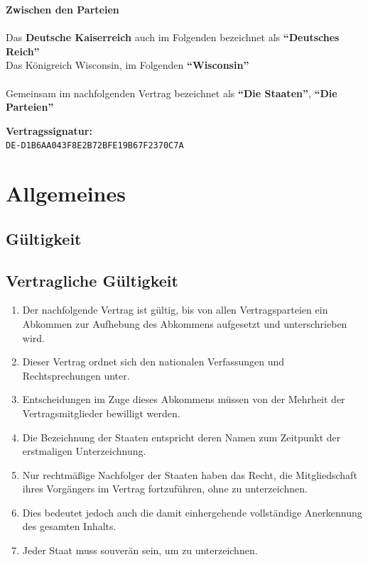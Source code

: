 \documentclass{article}
\begin{document}
\begin{center}
\begin{minipage}{0.45\textwidth}
    \end{minipage}
\end{center}


\begin{center}
    \textbf{Zwischen den Parteien\\}\textbf{\\}
    Das \textbf{Deutsche Kaiserreich} auch im Folgenden bezeichnet als \textbf{``Deutsches Reich''\\}
    Das Königreich Wisconsin, im Folgenden \textbf{``Wisconsin''\\}
    \textbf{\\}
    Gemeinsam im nachfolgenden Vertrag bezeichnet als \textbf{``Die Staaten''}, \textbf{``Die Parteien''}

\end{center}
\newpage
{}
\vspace*{\fill}
\begin{Center}
\textbf{Vertragssignatur:\\}
\texttt{DE-D1B6AA043F8E2B72BFE19B67F2370C7A}
\vspace*{\fill}
\end{Center}
\newpage
\section{Allgemeines}
\subsection{Gültigkeit}

\subsection{Vertragliche Gültigkeit}
\begin{enumerate}[(1)]
    \item Der nachfolgende Vertrag ist gültig, bis von allen Vertragsparteien ein Abkommen zur Aufhebung des Abkommens aufgesetzt und unterschrieben wird.
    \item Dieser Vertrag ordnet sich den nationalen Verfassungen und Rechtsprechungen unter.
    \item Entscheidungen im Zuge dieses Abkommens müssen von der Mehrheit der Vertragsmitglieder bewilligt werden.
    \item Die Bezeichnung der Staaten entspricht deren Namen zum Zeitpunkt der erstmaligen Unterzeichnung.
    \item Nur rechtmäßige Nachfolger der Staaten haben das Recht, die Mitgliedschaft ihres Vorgängers im Vertrag fortzuführen, ohne zu unterzeichnen.
    \item Dies bedeutet jedoch auch die damit einhergehende vollständige Anerkennung des gesamten Inhalts.
    \item Jeder Staat muss souverän sein, um zu unterzeichnen.
\end{enumerate}
\end{document}

